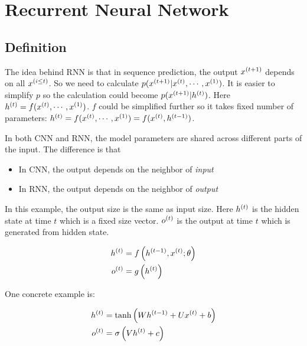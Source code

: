 \chapter{Recurrent Neural Network}


\section{Definition}

The idea behind RNN is that in sequence prediction, the output ${x}^{(t+1)}$ depends on all ${x}^{(i \leq t)}$. So we need to calculate $p({x}^{(t+1)}|{x}^{(t)}, \cdots, {x}^{(1)})$. It is easier to simplify $p$ so the calculation could become $p({x}^{(t+1)}|{h}^{(t)})$. Here ${h}^{(t)} = f({x}^{(t)}, \cdots, {x}^{(1)})$. $f$ could be simplified further so it takes fixed number of parameters: ${h}^{(t)} = f({x}^{(t)}, \cdots, {x}^{(1)}) = f({x}^{(t)}, {h}^{(t-1)})$.

In both CNN and RNN, the model parameters are shared across different parts of the input. The difference is that
\begin{itemize}
    \item In CNN, the output depends on the neighbor of \emph{input}
    \item In RNN, the output depends on the neighbor of \emph{output}
\end{itemize}


\begin{example}
    In this example, the output size is the same as input size. Here ${h}^{(t)}$ is the hidden state at time $t$ which is a fixed size vector. ${o}^{(t)}$ is the output at time $t$ which is generated from hidden state.
    
\begin{equation}
    \begin{aligned}
        {h}^{(t)} &= f\left({h}^{(t-1)}, {x}^{(t)}; \theta\right) \\   
        {o}^{(t)} &= g\left({h}^{(t)}\right)
    \end{aligned}    
\end{equation}

One concrete example is:

    \begin{equation}
        \begin{aligned}
            {h}^{(t)} &= \tanh\left( W {h}^{(t-1)} + U {x}^{(t)} + b \right) \\
            {o}^{(t)} &= \sigma \left(V {h}^{(t)} + c\right)
        \end{aligned}
    \end{equation}    
\end{example}


